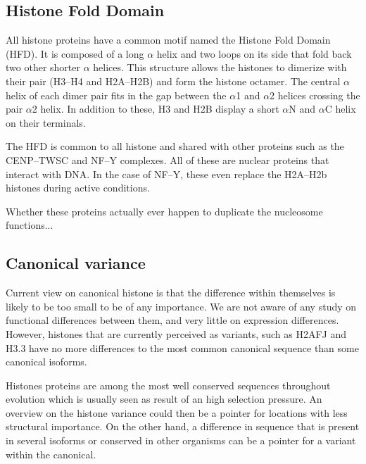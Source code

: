   \subsection{Histone Fold Domain}

    All histone proteins have a common motif named the Histone Fold Domain (HFD).
    It is composed of a long $\alpha$ helix and two loops on its side that fold
    back two other shorter $\alpha$ helices. This structure allows the histones
    to dimerize with their pair (H3--H4 and H2A--H2B) and form the histone
    octamer. The central $\alpha$ helix of each dimer pair fits in the gap between
    the $\alpha$1 and $\alpha$2 helices crossing the pair $\alpha$2 helix. In
    addition to these, H3 and H2B display a short $\alpha$N and $\alpha$C helix
    on their terminals.

    The HFD is common to all histone and shared with other
    proteins such as the CENP--TWSC and NF--Y complexes. All of these are nuclear
    proteins that interact with DNA. In the case of NF--Y, these even replace
    the H2A--H2b histones during active conditions.

    Whether these proteins actually ever happen to duplicate the nucleosome functions...

  \subsection{Canonical variance}

    Current view on canonical histone is that the difference within themselves
    is likely to be too small to be of any importance. We are not aware of any
    study on functional differences between them, and very little on
    expression differences. However, histones that are currently perceived as
    variants, such as H2AFJ and H3.3 have no more differences to the most
    common canonical sequence than some canonical isoforms.

    Histones proteins are among the most well conserved sequences throughout
    evolution which is usually seen as result of an high selection pressure.
    An overview on the histone variance could then be a pointer for locations
    with less structural importance. On the other hand, a difference in
    sequence that is present in several isoforms or conserved in other
    organisms can be a pointer for a variant within the canonical.

